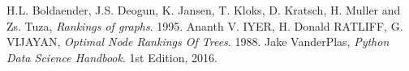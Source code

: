 \documentclass[11pt]{article}
\begin{document}
\begin{thebibliography}{999}

  H.L. Boldaender, J.S. Deogun, K. Jansen, T. Kloks, D. Kratsch, H. Muller and Zs. Tuza,
  \emph{Rankings of graphs}.
  1995.
  Ananth V. IYER, H. Donald RATLIFF, G. VIJAYAN,
  \emph{Optimal Node Rankings Of Trees}.
  1988.
  Jake VanderPlas,
  \emph{Python Data Science Handbook}.
  1st Edition, 2016.

\end{thebibliography}
\end{document}
